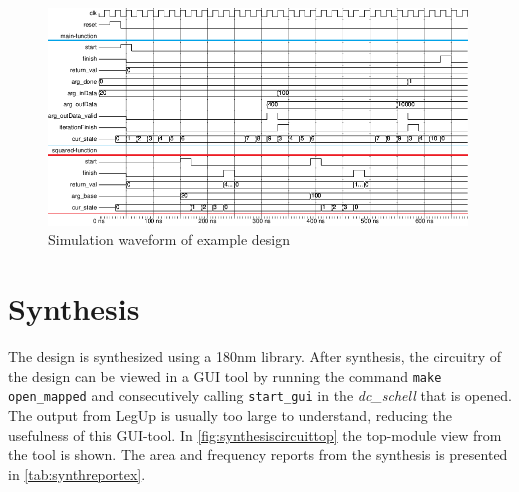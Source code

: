 \begin{figure}[hbpt]
\centering
\includegraphics[width=0.99\textwidth]{../figs/SimulationWaveEX.png}
\caption{\label{fig:simulationwave}Simulation waveform of example design}
\end{figure}
\section{Synthesis}
The design is synthesized using a 180nm library. After synthesis, the circuitry of the design can be viewed in a GUI tool by running the command \verb!make open_mapped! and consecutively calling \verb!start_gui! in the \textit{dc\_schell} that is opened. The output from LegUp is usually too large to understand, reducing the usefulness of this GUI-tool. In \cref{fig:synthesiscircuittop} the top-module view from the tool is shown. The area and frequency reports from the synthesis is presented in \cref{tab:synthreportex}.

